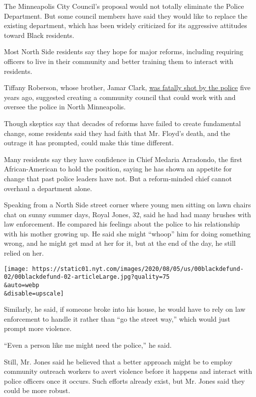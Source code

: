 The Minneapolis City Council's proposal would not totally eliminate the
Police Department. But some council members have said they would like to
replace the existing department, which has been widely criticized for
its aggressive attitudes toward Black residents.

Most North Side residents say they hope for major reforms, including
requiring officers to live in their community and better training them
to interact with residents.

Tiffany Roberson, whose brother, Jamar Clark,
\href{https://www.nytimes.com/2016/03/31/us/jamar-clark-shooting-minneapolis.html}{was
fatally shot by the police} five years ago, suggested creating a
community council that could work with and oversee the police in North
Minneapolis.

Though skeptics say that decades of reforms have failed to create
fundamental change, some residents said they had faith that Mr. Floyd's
death, and the outrage it has prompted, could make this time different.

Many residents say they have confidence in Chief Medaria Arradondo, the
first African-American to hold the position, saying he has shown an
appetite for change that past police leaders have not. But a
reform-minded chief cannot overhaul a department alone.

Speaking from a North Side street corner where young men sitting on lawn
chairs chat on sunny summer days, Royal Jones, 32, said he had had many
brushes with law enforcement. He compared his feelings about the police
to his relationship with his mother growing up. He said she might
``whoop'' him for doing something wrong, and he might get mad at her for
it, but at the end of the day, he still relied on her.

\texttt{[image: https://static01.nyt.com/images/2020/08/05/us/00blackdefund-02/00blackdefund-02-articleLarge.jpg?quality=75\\\&auto=webp\\\&disable=upscale]}

Similarly, he said, if someone broke into his house, he would have to
rely on law enforcement to handle it rather than ``go the street way,''
which would just prompt more violence.

``Even a person like me might need the police,'' he said.

Still, Mr. Jones said he believed that a better approach might be to
employ community outreach workers to avert violence before it happens
and interact with police officers once it occurs. Such efforts already
exist, but Mr. Jones said they could be more robust.

